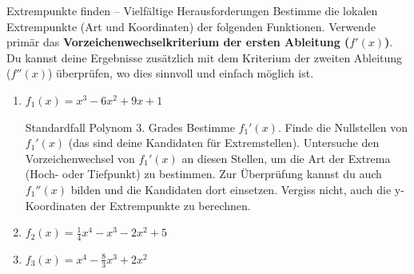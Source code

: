 
\begin{aufgabenumgebung}{Extrempunkte finden – Vielfältige Herausforderungen}
Bestimme die lokalen Extrempunkte (Art und Koordinaten) der folgenden Funktionen. Verwende primär das \textbf{Vorzeichenwechselkriterium der ersten Ableitung ($f'(x)$)}. Du kannst deine Ergebnisse zusätzlich mit dem Kriterium der zweiten Ableitung ($f''(x)$) überprüfen, wo dies sinnvoll und einfach möglich ist.
\begin{enumerate}
    \item $f_1(x) = x^3 - 6x^2 + 9x + 1$
        \begin{tippumgebung}{Standardfall Polynom 3. Grades}
        Bestimme $f_1'(x)$. Finde die Nullstellen von $f_1'(x)$ (das sind deine Kandidaten für Extremstellen). Untersuche den Vorzeichenwechsel von $f_1'(x)$ an diesen Stellen, um die Art der Extrema (Hoch- oder Tiefpunkt) zu bestimmen. Zur Überprüfung kannst du auch $f_1''(x)$ bilden und die Kandidaten dort einsetzen. Vergiss nicht, auch die y-Koordinaten der Extrempunkte zu berechnen.
        \end{tippumgebung}

    \item $f_2(x) = \frac{1}{4}x^4 - x^3 - 2x^2 + 5$

    \item $f_3(x) = x^4 - \frac{8}{3}x^3 + 2x^2$


\end{enumerate}
\end{aufgabenumgebung}
